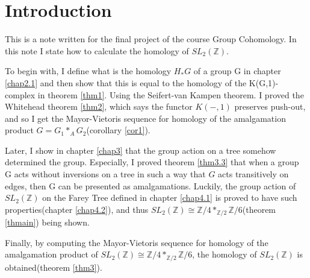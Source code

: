 \section{Introduction}
This is a note written for the final project of the course Group Cohomology. In this note I state how to calculate the homology of $SL_2(\mathbb{Z})$. 
\par
To begin with, I define what is the homology $H_\ast G$ of a group G in chapter \ref{chap2.1} and then show that this is equal to the homology of the K(G,1)-complex in theorem \ref{thm1}.  Using the Seifert-van Kampen theorem. I proved the Whitehead theorem \ref{thm2}, which says the functor $K(-, 1)$ preserves push-out, and so I get the Mayor-Vietoris sequence for homology of the amalgamation product $G=G_{1} *_{A} G_{2}$(corollary \ref{cor1}).
\par
Later, I show in chapter \ref{chap3} that the group action on a tree somehow determined the group. Especially, I proved theorem \ref{thm3.3} that when a group G acts without inversions on a tree in such a way that $G$ acts transitively on edges, then G can be presented as amalgamations. Luckily, the group action of $SL_2(\mathbb{Z})$ on the Farey Tree defined in chapter \ref{chap4.1} is proved to have such properties(chapter \ref{chap4.2}), and thus $S L_{2}(\mathbb{Z}) \cong \mathbb{Z} / 4 *_{\mathbb{Z} / 2} \mathbb{Z} / 6$(theorem \ref{thmain}) being shown. 
\par
Finally, by computing the Mayor-Vietoris sequence for homology of the amalgamation product of $S L_{2}(\mathbb{Z}) \cong \mathbb{Z} / 4 *_{\mathbb{Z} / 2} \mathbb{Z} / 6$, the homology of $S L_{2}(\mathbb{Z})$ is obtained(theorem \ref{thm3}).